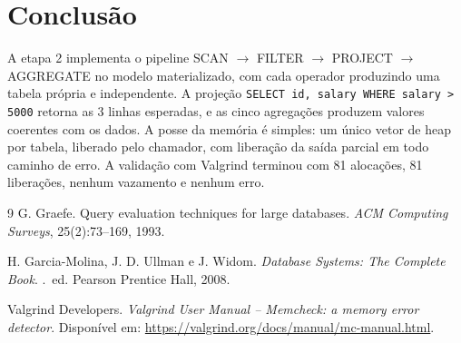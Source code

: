 \documentclass[11pt,a4paper]{article}
\begin{document}
\section{Conclusão}
A etapa 2 implementa o pipeline SCAN $\rightarrow$ FILTER $\rightarrow$ PROJECT $\rightarrow$ AGGREGATE no modelo materializado, com cada operador produzindo uma tabela própria e independente. A projeção \texttt{SELECT id, salary WHERE salary > 5000} retorna as 3 linhas esperadas, e as cinco agregações produzem valores coerentes com os dados. A posse da memória é simples: um único vetor de heap por tabela, liberado pelo chamador, com liberação da saída parcial em todo caminho de erro. A validação com Valgrind terminou com 81 alocações, 81 liberações, nenhum vazamento e nenhum erro.

{\small
\begin{thebibliography}{9}
G. Graefe.
\newblock Query evaluation techniques for large databases.
\newblock \emph{ACM Computing Surveys}, 25(2):73--169, 1993.

H. Garcia-Molina, J. D. Ullman e J. Widom.
\newblock \emph{Database Systems: The Complete Book}.
.\ ed. Pearson Prentice Hall, 2008.

Valgrind Developers.
\newblock \emph{Valgrind User Manual -- Memcheck: a memory error detector}.
\newblock Disponível em: \url{https://valgrind.org/docs/manual/mc-manual.html}.
\end{thebibliography}
}
\end{document}
